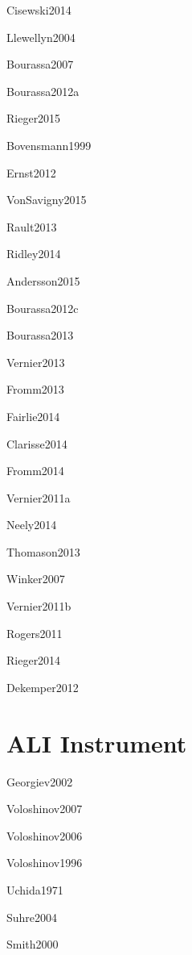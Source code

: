 \documentclass[12pt]{article}
\begin{document}
Cisewski2014 \citep{Cisewski2014}

Llewellyn2004 \citep{Llewellyn2004}

Bourassa2007 \citep{Bourassa2007}

Bourassa2012a \citep{Bourassa2012a}

Rieger2015 \citep{Rieger2015}

Bovensmann1999 \citep{Bovensmann1999}

Ernst2012 \citep{Ernst2012}

VonSavigny2015 \citep{VonSavigny2015}

Rault2013 \citep{Rault2013}

Ridley2014 \citep{Ridley2014}

Andersson2015 \citep{Andersson2015}

Bourassa2012c \citep{Bourassa2012c}

Bourassa2013 \citep{Bourassa2013}

Vernier2013 \citep{Vernier2013}

Fromm2013 \citep{Fromm2013}

Fairlie2014 \citep{Fairlie2014}

Clarisse2014 \citep{Clarisse2014}

Fromm2014 \citep{Fromm2014}

Vernier2011a \citep{Vernier2011a}

Neely2014 \citep{Neely2014}

Thomason2013 \citep{Thomason2013}

Winker2007 \citep{Winker2007}

Vernier2011b \citep{Vernier2011b}

Rogers2011 \citep{Rogers2011}

Rieger2014 \citep{Rieger2014}

Dekemper2012 \citep{Dekemper2012}

\section{ALI Instrument}

Georgiev2002 \citep{Georgiev2002}

Voloshinov2007 \citep{Voloshinov2007}

Voloshinov2006 \citep{Voloshinov2006}

Voloshinov1996 \citep{Voloshinov1996}

Uchida1971 \citep{Uchida1971}

Suhre2004 \citep{Suhre2004}

Smith2000 \citep{Smith2000}
\end{document}
